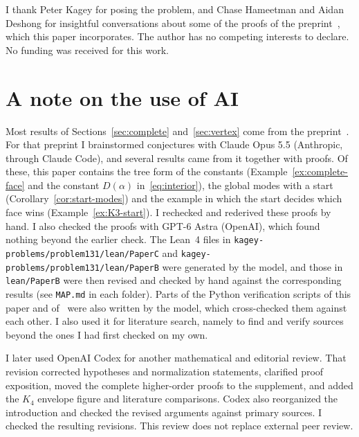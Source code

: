 \documentclass[EJP,preprint]{ejpecp}
\theoremstyle{ejpecpbodyit}
\begin{document}









\appendix





\begin{acks}
I thank Peter Kagey for posing the problem, and Chase Hameetman and Aidan Deshong for
insightful conversations about some of the proofs of the preprint~\cite{paperB}, which this
paper incorporates. The author has no competing interests to declare. No funding was received for
this work.
\end{acks}

\section*{A note on the use of AI}
Most results of Sections~\ref{sec:complete} and~\ref{sec:vertex} come from
the preprint~\cite{paperB}. For that preprint I brainstormed conjectures with Claude Opus 5.5
(Anthropic, through Claude Code), and several results came from it together with proofs. Of these,
this paper contains the tree form of the constants
(Example~\ref{ex:complete-face} and the constant $D(\alpha)$ in~\eqref{eq:interior}), the global
modes with a start (Corollary~\ref{cor:start-modes}) and the example in which the start decides
which face wins (Example~\ref{ex:K3-start}). I rechecked and rederived these proofs by hand. I
also checked the proofs with GPT-6 Astra (OpenAI), which found nothing beyond the earlier check.
The Lean~4 files in \nolinkurl{kagey-problems/problem131/lean/PaperC} and
\nolinkurl{kagey-problems/problem131/lean/PaperB} were generated by the model, and those in
\nolinkurl{lean/PaperB} were then revised and checked by hand against the corresponding results
(see \nolinkurl{MAP.md} in each folder). Parts of the Python verification scripts of this paper and
of~\cite{paperB} were also written by the model, which cross-checked them against each other.
I also used it for literature search, namely to find and verify sources beyond the ones I had
first checked on my own.

I later used OpenAI Codex for another mathematical and editorial review.
That revision corrected hypotheses and normalization statements, clarified
proof exposition, moved the complete higher-order proofs to the supplement,
and added the $K_4$ envelope figure and literature comparisons. Codex also
reorganized the introduction and checked the revised arguments against
primary sources. I checked the resulting revisions. This review does not
replace external peer review.
\end{document}
